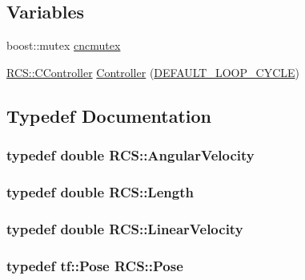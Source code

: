 \subsection*{Variables}
\begin{DoxyCompactItemize}
\item 
boost\-::mutex \hyperlink{namespaceRCS_a021572a9d03c82d96029e82ea5691d60}{cncmutex}
\item 
\hyperlink{structRCS_1_1CController}{R\-C\-S\-::\-C\-Controller} \hyperlink{namespaceRCS_a9d517dc59f249be605546c3a36086b19}{Controller} (\hyperlink{RCS_8h_a226eb3a426e9df46b88c4ba34f217203}{D\-E\-F\-A\-U\-L\-T\-\_\-\-L\-O\-O\-P\-\_\-\-C\-Y\-C\-L\-E})
\end{DoxyCompactItemize}


\subsection{Typedef Documentation}
\hypertarget{namespaceRCS_a3ca212cf7a0c547f5496352e850372a9}{
\subsubsection[{Angular\-Velocity}]{\setlength{\rightskip}{0pt plus 5cm}typedef double {\bf R\-C\-S\-::\-Angular\-Velocity}}}\label{namespaceRCS_a3ca212cf7a0c547f5496352e850372a9}
\hypertarget{namespaceRCS_a86ac9427c1a3f2ec2b94a74888b2cefd}{
\subsubsection[{Length}]{\setlength{\rightskip}{0pt plus 5cm}typedef double {\bf R\-C\-S\-::\-Length}}}\label{namespaceRCS_a86ac9427c1a3f2ec2b94a74888b2cefd}
\hypertarget{namespaceRCS_a20e104cd075c4ca08a073a6261a70a84}{
\subsubsection[{Linear\-Velocity}]{\setlength{\rightskip}{0pt plus 5cm}typedef double {\bf R\-C\-S\-::\-Linear\-Velocity}}}\label{namespaceRCS_a20e104cd075c4ca08a073a6261a70a84}
\hypertarget{namespaceRCS_aa07e45d8a50e30064283d2b38087f999}{
\subsubsection[{Pose}]{\setlength{\rightskip}{0pt plus 5cm}typedef tf\-::\-Pose {\bf R\-C\-S\-::\-Pose}}}\label{namespaceRCS_aa07e45d8a50e30064283d2b38087f999}
